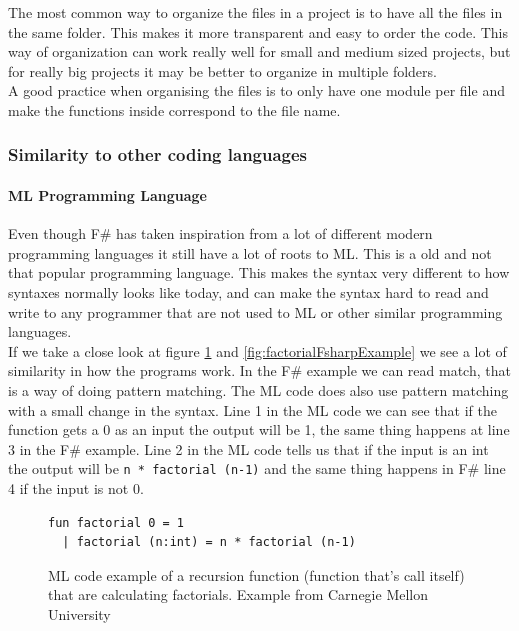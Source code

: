 \documentclass[12pt, a4paper]{article}
\newcommand{\code}[1]{{\small \texttt{#1}}}
\begin{document}
The most common way to organize the files in a project is to have all the files in the same folder. This makes it more transparent and easy to order the code. This way of organization can work really well for small and medium sized projects, but for really big projects it may be better to organize in multiple folders.\\

A good practice when organising the files is to only have one module per file and make the functions inside correspond to the file name.\\

\newpage
\subsubsection{Similarity to other coding languages}

\paragraph{ML Programming Language}

Even though F\# has taken inspiration from a lot of different modern programming languages it still have a lot of roots to ML. This is a old and not that popular programming language. This makes the syntax very different to how syntaxes normally looks like today, and can make the syntax hard to read and write to any programmer that are not used to ML or other similar programming languages.\\

If we take a close look at figure \ref{fig:factorialMLExample} and \ref{fig:factorialFsharpExample} we see a lot of similarity in how the programs work. In the F\# example we can read match, that is a way of doing pattern matching. The ML code does also use pattern matching with a small change in the syntax. Line 1 in the ML code we can see that if the function gets a 0 as an input the output will be 1, the same thing happens at line 3 in the F\# example. Line 2 in the ML code tells us that if the input is an int the output will be \code{n * factorial (n-1)} and the same thing happens in F\# line 4 if the input is not 0.\\

\begin{figure}[!h]
	\begin{lstlisting}
fun factorial 0 = 1
  | factorial (n:int) = n * factorial (n-1)
	\end{lstlisting}
	\caption{ML code example of a recursion function (function that's call itself) that are calculating factorials. Example from Carnegie Mellon University\cite{carnegieMellon}}
	\label{fig:factorialMLExample}
\end{figure}
\end{document}
